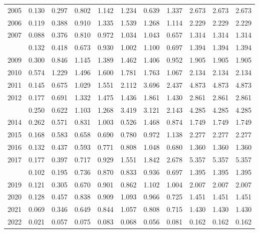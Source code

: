 \documentclass[
]{article}
\begin{document}
\begin{longtable}[t]{lrrrrrrrrrr}
2005 & 0.130 & 0.297 & 0.802 & 1.142 & 1.234 & 0.639 & 1.337 & 2.673 & 2.673 & 2.673\\
2006 & 0.119 & 0.388 & 0.910 & 1.335 & 1.539 & 1.268 & 1.114 & 2.229 & 2.229 & 2.229\\
2007 & 0.088 & 0.376 & 0.810 & 0.972 & 1.034 & 1.043 & 0.657 & 1.314 & 1.314 & 1.314\\
\addlinespace
2008 & 0.132 & 0.418 & 0.673 & 0.930 & 1.002 & 1.100 & 0.697 & 1.394 & 1.394 & 1.394\\
2009 & 0.300 & 0.846 & 1.145 & 1.389 & 1.462 & 1.406 & 0.952 & 1.905 & 1.905 & 1.905\\
2010 & 0.574 & 1.229 & 1.496 & 1.600 & 1.781 & 1.763 & 1.067 & 2.134 & 2.134 & 2.134\\
2011 & 0.145 & 0.675 & 1.029 & 1.551 & 2.112 & 3.696 & 2.437 & 4.873 & 4.873 & 4.873\\
2012 & 0.177 & 0.691 & 1.332 & 1.475 & 1.436 & 1.861 & 1.430 & 2.861 & 2.861 & 2.861\\
\addlinespace
2013 & 0.250 & 0.622 & 1.103 & 1.268 & 3.419 & 3.121 & 2.143 & 4.285 & 4.285 & 4.285\\
2014 & 0.262 & 0.571 & 0.831 & 1.003 & 0.526 & 1.468 & 0.874 & 1.749 & 1.749 & 1.749\\
2015 & 0.168 & 0.583 & 0.658 & 0.690 & 0.780 & 0.972 & 1.138 & 2.277 & 2.277 & 2.277\\
2016 & 0.132 & 0.437 & 0.593 & 0.771 & 0.808 & 1.048 & 0.680 & 1.360 & 1.360 & 1.360\\
2017 & 0.177 & 0.397 & 0.717 & 0.929 & 1.551 & 1.842 & 2.678 & 5.357 & 5.357 & 5.357\\
\addlinespace
2018 & 0.102 & 0.195 & 0.736 & 0.870 & 0.833 & 0.936 & 0.697 & 1.395 & 1.395 & 1.395\\
2019 & 0.121 & 0.305 & 0.670 & 0.901 & 0.862 & 1.102 & 1.004 & 2.007 & 2.007 & 2.007\\
2020 & 0.128 & 0.457 & 0.838 & 0.909 & 1.093 & 0.966 & 0.725 & 1.451 & 1.451 & 1.451\\
2021 & 0.069 & 0.346 & 0.649 & 0.844 & 1.057 & 0.808 & 0.715 & 1.430 & 1.430 & 1.430\\
2022 & 0.021 & 0.057 & 0.075 & 0.083 & 0.068 & 0.056 & 0.081 & 0.162 & 0.162 & 0.162\\*
\end{longtable}
\end{document}
